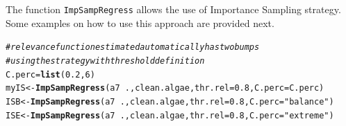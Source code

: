 \documentclass[10pt,a4paper]{article}\usepackage[]{graphicx}\usepackage[]{color}
\makeatletter
\newcommand{\hlnum}[1]{\textcolor[rgb]{0.686,0.059,0.569}{#1}}%
\newcommand{\hlstr}[1]{\textcolor[rgb]{0.192,0.494,0.8}{#1}}%
\newcommand{\hlcom}[1]{\textcolor[rgb]{0.678,0.584,0.686}{\textit{#1}}}%
\newcommand{\hlopt}[1]{\textcolor[rgb]{0,0,0}{#1}}%
\newcommand{\hlstd}[1]{\textcolor[rgb]{0.345,0.345,0.345}{#1}}%
\newcommand{\hlkwb}[1]{\textcolor[rgb]{0.69,0.353,0.396}{#1}}%
\newcommand{\hlkwc}[1]{\textcolor[rgb]{0.333,0.667,0.333}{#1}}%
\newcommand{\hlkwd}[1]{\textcolor[rgb]{0.737,0.353,0.396}{\textbf{#1}}}%
\newenvironment{kframe}{%
 \def\at@end@of@kframe{}%
 \ifinner\ifhmode%
  \def\at@end@of@kframe{\end{minipage}}%
  \begin{minipage}{\columnwidth}%
 \fi\fi%
 \def\FrameCommand##1{\hskip\@totalleftmargin \hskip-\fboxsep
 \colorbox{shadecolor}{##1}\hskip-\fboxsep
     \hskip-\linewidth \hskip-\@totalleftmargin \hskip\columnwidth}%
 \MakeFramed {\advance\hsize-\width
   \@totalleftmargin\z@ \linewidth\hsize
   \@setminipage}}%
 {\par\unskip\endMakeFramed%
 \at@end@of@kframe}
\newenvironment{knitrout}{}{} %
\makeatother
\begin{document}
The function \texttt{ImpSampRegress} allows the use of Importance Sampling strategy. Some examples on how to use this approach are provided next.
\begin{knitrout}\footnotesize
{}\color{fgcolor}\begin{kframe}
\begin{alltt}
\hlcom{# relevance function estimated automatically has two bumps}
\hlcom{# using the strategy with threshold definition}
\hlstd{C.perc}\hlkwb{=}\hlkwd{list}\hlstd{(}\hlnum{0.2}\hlstd{,}\hlnum{6}\hlstd{)}
\hlstd{myIS} \hlkwb{<-} \hlkwd{ImpSampRegress}\hlstd{(a7}\hlopt{~}\hlstd{., clean.algae,} \hlkwc{thr.rel}\hlstd{=}\hlnum{0.8}\hlstd{,}\hlkwc{C.perc}\hlstd{=C.perc)}
\hlstd{ISB} \hlkwb{<-} \hlkwd{ImpSampRegress}\hlstd{(a7}\hlopt{~}\hlstd{., clean.algae,} \hlkwc{thr.rel}\hlstd{=}\hlnum{0.8}\hlstd{,} \hlkwc{C.perc}\hlstd{=}\hlstr{"balance"}\hlstd{)}
\hlstd{ISE} \hlkwb{<-} \hlkwd{ImpSampRegress}\hlstd{(a7}\hlopt{~}\hlstd{., clean.algae,} \hlkwc{thr.rel}\hlstd{=}\hlnum{0.8}\hlstd{,} \hlkwc{C.perc}\hlstd{=}\hlstr{"extreme"}\hlstd{)}
\end{alltt}
\end{kframe}
\end{knitrout}
\end{document}
